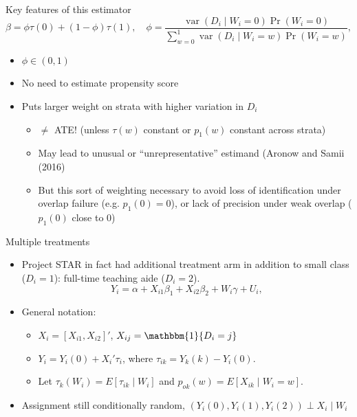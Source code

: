 \documentclass[notes,11pt, aspectratio=169]{beamer}
\DeclareMathOperator{\var}{var}
\newcommand\1{\operatorname{\mathbbm{1}}\indicatorfence}
\begin{document}
\begin{frame}{Key features of this estimator}
    \begin{equation*}
      \beta=\phi\tau(0)+(1-\phi)\tau(1),\quad
      \phi= \frac{\var(D_i\mid W_i=0)\Pr(W_i=0)}{\sum_{w=0}^{1}
        \var(D_i\mid W_i=w)\Pr(W_i=w)},
    \end{equation*}
  \begin{itemize}
  \item $\phi\in (0,1)$
  \item No need to estimate propensity score
  \item Puts larger weight on strata with higher variation in $D_{i}$
    \begin{itemize}
    \item $\neq$ ATE! (unless $\tau(w)$ constant or $p_{1}(w)$ constant
      across strata)
    \item May lead to unusual or ``unrepresentative'' estimand (Aronow and Samii (2016)
    \item But this sort of weighting necessary to avoid loss of identification
      under overlap failure (e.g. $p_{1}(0)=0$), or lack of precision under weak
      overlap ($p_{1}(0)$ close to $0$)
    \end{itemize}
  \end{itemize}
\end{frame}

\begin{frame}{Multiple treatments}

  \begin{itemize}
  \item Project STAR in fact had additional treatment arm in addition to small
    class ($D_{i}=1$): full-time teaching aide ($D_i=2$).
    \begin{equation*}
      Y_i=\alpha+  X_{i1}\beta_{1}+X_{i2}\beta_{2}+W_i\gamma +U_i,
    \end{equation*}
  \item General notation:
    \begin{itemize}
    \item $X_{i} = [X_{i1}, X_{i2}]'$, $X_{ij}=\1{D_{i}=j}$
    \item $Y_i=Y_i(0)+X_{i}'\tau_{i}$, where $\tau_{ik}=Y_{k}(k)-Y_{i}(0)$.
    \item Let $\tau_{k}(W_{i})=E[\tau_{ik}\mid W_{i}]$ and
      $p_{ok}(w)=E[X_{ik}\mid W_{i}=w]$.
    \end{itemize}
  \item Assignment still conditionally random,
    $\left(Y_i(0),Y_i(1),Y_i(2)\right)\perp {X}_i \mid W_i$
  \end{itemize}
\end{frame}
\end{document}
